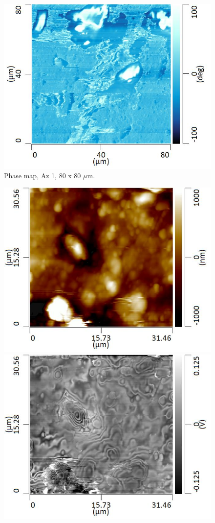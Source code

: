 \begin{figure}[H]
\centering
  \includegraphics[width=.45\textwidth]{Az1_tapping_mode_240521_phase_1}
\caption[Phase map, Az 1]{Phase map, Az 1, 80 x 80 $\mu$m.}
\label{fig:afm_az1_phase_1}
\end{figure}


\begin{figure}[H]
\centering
\begin{minipage}{.45\textwidth}
  \centering
  \includegraphics[width=\linewidth]{Az1_tapping_mode_240521_height_2}
\end{minipage}
\begin{minipage}{.45\textwidth}
  \centering
  \includegraphics[width=\linewidth]{Az1_tapping_mode_240521_def_2}

\end{minipage}
\end{figure}
